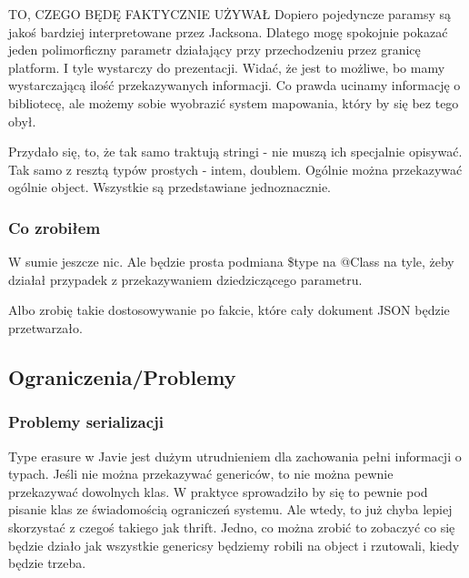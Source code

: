 TO, CZEGO BĘDĘ FAKTYCZNIE UŻYWAŁ
Dopiero pojedyncze paramsy są jakoś bardziej interpretowane przez Jacksona. Dlatego mogę spokojnie pokazać jeden polimorficzny parametr działający przy przechodzeniu przez granicę platform. I tyle wystarczy do prezentacji. Widać, że jest to możliwe, bo mamy wystarczającą ilość przekazywanych informacji. Co prawda ucinamy informację o bibliotecę, ale możemy sobie wyobrazić system mapowania, który by się bez tego obył.

Przydało się, to, że tak samo traktują stringi - nie muszą ich specjalnie opisywać. Tak samo z resztą typów prostych - intem, doublem. Ogólnie można przekazywać ogólnie object. Wszystkie są przedstawiane jednoznacznie.

\subsubsection{Co zrobiłem}
W sumie jeszcze nic. Ale będzie prosta podmiana \$type na @Class na tyle, żeby działał przypadek z przekazywaniem dziedziczącego parametru.

Albo zrobię takie dostosowywanie po fakcie, które cały dokument JSON będzie przetwarzało.


\subsection{Ograniczenia/Problemy}
\subsubsection{Problemy serializacji}
Type erasure w Javie jest dużym utrudnieniem dla zachowania pełni informacji o typach.
Jeśli nie można przekazywać genericów, to nie można pewnie przekazywać dowolnych klas. W praktyce sprowadziło by się to pewnie pod pisanie klas ze świadomością ograniczeń systemu. Ale wtedy, to już chyba lepiej skorzystać z czegoś takiego jak thrift.
Jedno, co można zrobić to zobaczyć co się będzie działo jak wszystkie genericsy będziemy robili na object i rzutowali, kiedy będzie trzeba.


